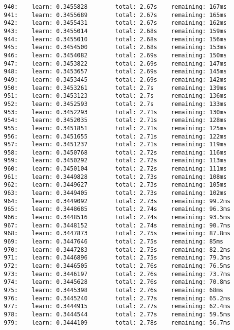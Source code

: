 \documentclass[11pt]{article}
\begin{document}
\begin{Verbatim}[commandchars=\\\{\}]
940:    learn: 0.3455828        total: 2.67s    remaining: 167ms
941:    learn: 0.3455689        total: 2.67s    remaining: 165ms
942:    learn: 0.3455431        total: 2.67s    remaining: 162ms
943:    learn: 0.3455014        total: 2.68s    remaining: 159ms
944:    learn: 0.3455010        total: 2.68s    remaining: 156ms
945:    learn: 0.3454500        total: 2.68s    remaining: 153ms
946:    learn: 0.3454082        total: 2.69s    remaining: 150ms
947:    learn: 0.3453822        total: 2.69s    remaining: 147ms
948:    learn: 0.3453657        total: 2.69s    remaining: 145ms
949:    learn: 0.3453445        total: 2.69s    remaining: 142ms
950:    learn: 0.3453261        total: 2.7s     remaining: 139ms
951:    learn: 0.3453123        total: 2.7s     remaining: 136ms
952:    learn: 0.3452593        total: 2.7s     remaining: 133ms
953:    learn: 0.3452293        total: 2.71s    remaining: 130ms
954:    learn: 0.3452035        total: 2.71s    remaining: 128ms
955:    learn: 0.3451851        total: 2.71s    remaining: 125ms
956:    learn: 0.3451655        total: 2.71s    remaining: 122ms
957:    learn: 0.3451237        total: 2.71s    remaining: 119ms
958:    learn: 0.3450768        total: 2.72s    remaining: 116ms
959:    learn: 0.3450292        total: 2.72s    remaining: 113ms
960:    learn: 0.3450104        total: 2.72s    remaining: 111ms
961:    learn: 0.3449828        total: 2.73s    remaining: 108ms
962:    learn: 0.3449627        total: 2.73s    remaining: 105ms
963:    learn: 0.3449405        total: 2.73s    remaining: 102ms
964:    learn: 0.3449092        total: 2.73s    remaining: 99.2ms
965:    learn: 0.3448685        total: 2.74s    remaining: 96.3ms
966:    learn: 0.3448516        total: 2.74s    remaining: 93.5ms
967:    learn: 0.3448152        total: 2.74s    remaining: 90.7ms
968:    learn: 0.3447873        total: 2.75s    remaining: 87.8ms
969:    learn: 0.3447646        total: 2.75s    remaining: 85ms
970:    learn: 0.3447283        total: 2.75s    remaining: 82.2ms
971:    learn: 0.3446896        total: 2.75s    remaining: 79.3ms
972:    learn: 0.3446505        total: 2.76s    remaining: 76.5ms
973:    learn: 0.3446197        total: 2.76s    remaining: 73.7ms
974:    learn: 0.3445628        total: 2.76s    remaining: 70.8ms
975:    learn: 0.3445398        total: 2.76s    remaining: 68ms
976:    learn: 0.3445240        total: 2.77s    remaining: 65.2ms
977:    learn: 0.3444915        total: 2.77s    remaining: 62.4ms
978:    learn: 0.3444544        total: 2.77s    remaining: 59.5ms
979:    learn: 0.3444109        total: 2.78s    remaining: 56.7ms

\end{Verbatim}
\end{document}
